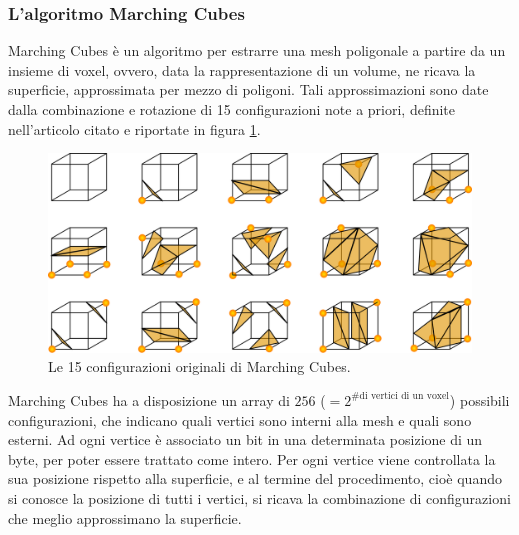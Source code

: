 \subsubsection{L'algoritmo Marching Cubes}
\label{mcalgo} Marching Cubes \cite{Lorensen:1987:MCH:37402.37422} è un algoritmo per estrarre una mesh poligonale a partire da un insieme di voxel, ovvero, data la rappresentazione di un volume, ne ricava la superficie, approssimata per mezzo di poligoni. Tali approssimazioni sono date dalla combinazione e rotazione di 15 configurazioni note a priori, definite nell'articolo citato e riportate in figura \ref{fig:mcpolys}.

\begin{figure}[htp]
	\centering
	\includegraphics[width=.85\textwidth]{img/mcpolys}
	\caption{Le 15 configurazioni originali di Marching Cubes.}
	\label{fig:mcpolys}
\end{figure}

Marching Cubes ha a disposizione un array di $256$ ($ = 2^{\mbox{\# di vertici di un voxel}}$) possibili configurazioni, che indicano quali vertici sono interni alla mesh e quali sono esterni. Ad ogni vertice è associato un bit in una determinata posizione di un byte, per poter essere trattato come intero. Per ogni vertice viene controllata la sua posizione rispetto alla superficie, e al termine del procedimento, cioè quando si conosce la posizione di tutti i vertici, si ricava la combinazione di configurazioni che meglio approssimano la superficie.

